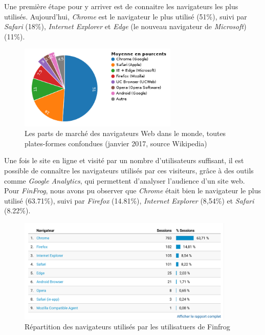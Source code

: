 \documentclass[12pt,a4paper]{article}
\begin{document}
  \bigskip

  Une première étape pour y arriver est de connaitre les navigateurs les
  plus utilisés. Aujourd'hui, \emph{Chrome} est le navigateur le plus
  utilisé (51\%), suivi par \emph{Safari} (18\%), \emph{Internet Explorer}
  et \emph{Edge} (le nouveau navigateur de \emph{Microsoft}) (11\%).

  \begin{figure}[h]
    \centering
    \includegraphics[height=4cm]{figures/browsers.png}
    \caption{Les parts de marché des navigateurs Web dans le monde, toutes plates-formes confondues (janvier 2017, source Wikipedia)}
  \end{figure}

  \bigskip

  Une fois le site en ligne et visité par un nombre d'utilisateurs
  suffisant, il est possible de connaître les navigateurs utilisés par ces
  visiteurs, grâce à des outils comme \emph{Google Analytics}, qui
  permettent d'analyser l'audience d'un site web. Pour \emph{FinFrog},
  nous avons pu observer que \emph{Chrome} était bien le navigateur le
  plus utilisé (63.71\%), suivi par \emph{Firefox} (14.81\%),
  \emph{Internet Explorer} (8,54\%) et \emph{Safari} (8.22\%).

  \begin{figure}[h]
    \centering
    \includegraphics[height=5cm]{figures/FF-browsers.png}
    \caption{Répartition des navigateurs utilisés par les utilisatuers de Finfrog}
  \end{figure}

  \bigskip
\end{document}
